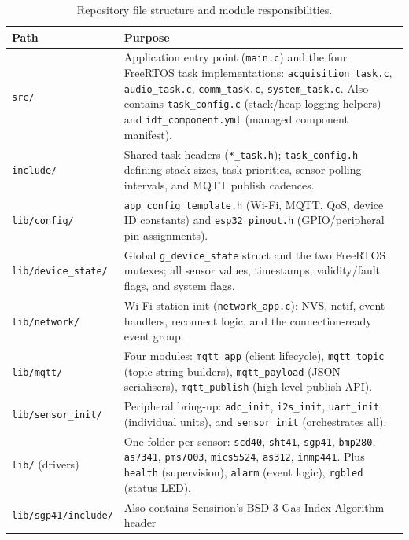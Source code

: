 \documentclass[11pt,a4paper]{article}
\newcommand{\rowhdr}{\rowcolor{tablehdr}}
\begin{document}
{\footnotesize
\setlength{\tabcolsep}{4pt}
\renewcommand{\arraystretch}{1.1}

\begin{longtable}{@{}p{3.5cm}p{12.2cm}@{}}
\caption{Repository file structure and module responsibilities.\label{tab:file_structure}}\\
\rowhdr
\textbf{Path} & \textbf{Purpose} \\
\midrule
\endhead
\texttt{src/} & Application entry point (\texttt{main.c}) and the four FreeRTOS task implementations:
  \texttt{acquisition\_task.c}, \texttt{audio\_task.c}, \texttt{comm\_task.c},
  \texttt{system\_task.c}. Also contains \texttt{task\_config.c} (stack/heap logging helpers)
  and \texttt{idf\_component.yml} (managed component manifest). \\
\texttt{include/} & Shared task headers (\texttt{*\_task.h}); \texttt{task\_config.h} defining
  stack sizes, task priorities, sensor polling intervals, and MQTT publish cadences. \\
\texttt{lib/config/} & \texttt{app\_config\_template.h} (Wi-Fi, MQTT, QoS, device ID constants)
  and \texttt{esp32\_pinout.h} (GPIO/peripheral pin assignments). \\
\texttt{lib/device\_state/} & Global \texttt{g\_device\_state} struct and the two FreeRTOS
  mutexes; all sensor values, timestamps, validity/fault flags, and system flags. \\
\texttt{lib/network/} & Wi-Fi station init (\texttt{network\_app.c}): NVS, netif, event handlers,
  reconnect logic, and the connection-ready event group. \\
\texttt{lib/mqtt/} & Four modules: \texttt{mqtt\_app} (client lifecycle), \texttt{mqtt\_topic}
  (topic string builders), \texttt{mqtt\_payload} (JSON serialisers),
  \texttt{mqtt\_publish} (high-level publish API). \\
\texttt{lib/sensor\_init/} & Peripheral bring-up: \texttt{adc\_init}, \texttt{i2s\_init},
  \texttt{uart\_init} (individual units), and \texttt{sensor\_init} (orchestrates all). \\
\texttt{lib/} (drivers) & One folder per sensor: \texttt{scd40}, \texttt{sht41}, \texttt{sgp41},
  \texttt{bmp280}, \texttt{as7341}, \texttt{pms7003}, \texttt{mics5524}, \texttt{as312},
  \texttt{inmp441}. Plus \texttt{health} (supervision), \texttt{alarm} (event logic),
  \texttt{rgbled} (status LED). \\
\texttt{lib/sgp41/include/} & Also contains Sensirion's BSD-3 Gas Index Algorithm header

\end{longtable}}
\end{document}

